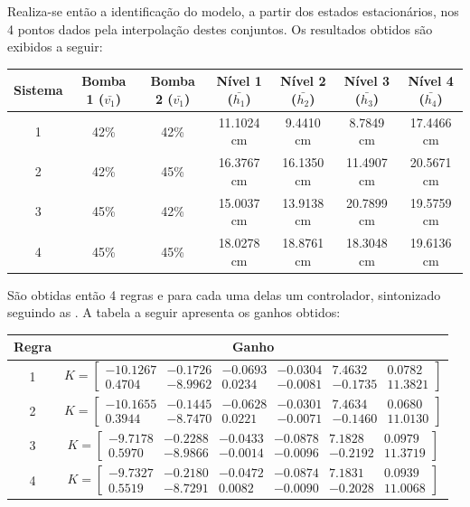 Realiza-se então a identificação do modelo, a partir dos estados estacionários, nos 4 pontos dados pela interpolação destes conjuntos. Os resultados obtidos são exibidos a seguir:

\begin{center}
	\begin{tabular}{|c|c|c|c|c|c|c|}
		\hline
		Sistema & Bomba 1 ($\bar{v_1}$) & Bomba 2 ($\bar{v_1}$) & Nível 1 ($\bar{h_1}$) & Nível 2 ($\bar{h_2}$) & Nível 3 ($\bar{h_3}$) & Nível 4 ($\bar{h_4}$) \\ \hline
		1 & 42\% & 42\% & 11.1024 cm &  9.4410 cm &  8.7849 cm & 17.4466 cm \\ \hline
		2 & 42\% & 45\% & 16.3767 cm &  16.1350 cm & 11.4907 cm & 20.5671 cm \\ \hline
		3 & 45\% & 42\% & 15.0037 cm &  13.9138 cm & 20.7899 cm & 19.5759 cm \\ \hline
		4 & 45\% & 45\% & 18.0278 cm &  18.8761 cm & 18.3048 cm & 19.6136 cm \\	\hline
	\end{tabular}
\end{center}

São obtidas então 4 regras e para cada uma delas um controlador, sintonizado seguindo as . A tabela a seguir apresenta os ganhos obtidos:
\begin{center} \label{tabGanhosReais}
	\begin{tabular}{|c|c|}
		\hline
		Regra & Ganho \\ \hline
		1 & $ K = 
		\begin{bmatrix}
			-10.1267 &  -0.1726 & -0.0693 &  -0.0304 & 7.4632  &  0.0782 \\
			0.4704   & -8.9962  &  0.0234 &  -0.0081 & -0.1735 & 11.3821
		\end{bmatrix}$ \\[10pt] \hline
		2 & $ K = 
		\begin{bmatrix}
			-10.1655 &  -0.1445 &  -0.0628 &  -0.0301 &  7.4634 & 0.0680 \\
			0.3944   & -8.7470  &  0.0221  & -0.0071  & -0.1460 & 11.0130
		\end{bmatrix}$ \\[10pt] \hline
		3 & $ K = 
		\begin{bmatrix}
			-9.7178 &  -0.2288 &  -0.0433 &  -0.0878 &   7.1828 &   0.0979 \\
			0.5970  & -8.9866  & -0.0014  & -0.0096  & -0.2192  & 11.3719
		\end{bmatrix}$ \\[10pt] \hline
		4 & $ K = 
		\begin{bmatrix}
			-9.7327 &  -0.2180 &  -0.0472 &  -0.0874 &   7.1831 &   0.0939 \\
			0.5519  & -8.7291  &  0.0082  & -0.0090  & -0.2028  & 11.0068
		\end{bmatrix}$ \\[10pt] \hline
	\end{tabular}
\end{center}

